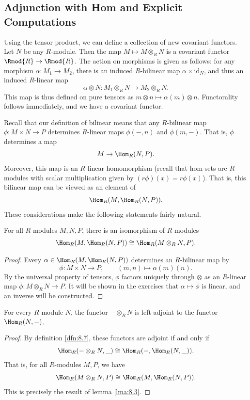 \subsection{Adjunction with Hom and Explicit Computations}
Using the tensor product, we can define a collection of new covariant functors. Let $N$ be any $R$-module. Then the map $M\mapsto M\otimes_R N$ is a covariant functor $\Rmod{R} \to \Rmod{R} $. The action on morphisms is given as follows: for any morphism $\alpha : M_1 \to M_2$, there is an induced $R$-bilinear map $\alpha \times \mathrm{id}_N$, and thus an induced $R$-linear map
\[
	\alpha \otimes N : M_1 \otimes_R N \to M_2 \otimes_R N
.\]
This map is thus defined on pure tensors as $m\otimes n\mapsto \alpha (m)\otimes n$. Functorality follows immediately, and we have a covariant functor.

Recall that our definition of bilinear means that any $R$-bilinear map $\phi : M\times N \to P$ determines $R$-linear maps $\phi (-,n)$ and $\phi (m,-)$. That is, $\phi $ determines a map
\[
	M\to \Hom_{R}(N, P) 
.\]
Moreover, this map is an $R$-linear homomorphism (recall that hom-sets are $R$-modules with scalar multiplication given by $(r\phi )(x)=r\phi (x)$). That is, this bilinear map can be viewed as an element of
\[\Hom_{R}(M, \Hom_{R}(N, P) ) .\]
These considerations make the following statements fairly natural.
\begin{lemma}\label{lma:8.3}
	For all $R$-modules $M,N,P$, there is an isomorphism of $R$-modules
	\[
		\Hom_{R}(M, \Hom_{R}(N, P) ) \cong \Hom_{R}(M\otimes_RN, P) 
	.\]
\end{lemma}
\begin{proof}
	Every $\alpha \in \Hom_{R}(M, \Hom_{R}(N, P) ) $ determines an $R$-bilinear map by
	\[
		\phi : M\times N \to P,\qquad (m,n)\mapsto \alpha (m)(n)
	.\]
	By the universal property of tensors, $\phi $ factors uniquely through $\otimes $ as an $R$-linear map $\overline{\phi } : M\otimes_R N \to P$. It will be shown in the exercises that $\alpha \mapsto \overline{\phi } $ is linear, and an inverse will be constructed.
\end{proof}
\begin{corollary}\label{cor:8.1}
	For every $R$-module $N$, the functor $-\otimes_R N$ is left-adjoint to the functor $\Hom_{R}(N, -) $.
\end{corollary}
\begin{proof}
	By definition \ref{dfn:8.7}, these functors are adjoint if and only if
	\[
		\Hom_{R}(-\otimes_R N, \_) \cong \Hom_{R}(-, \Hom_{R}(N, \_) ) 
	.\]
	That is, for all $R$-modules $M,P$, we have
	\[
		\Hom_{R}(M\otimes_R N, P) \cong \Hom_{R}(M, \Hom_{R}(N, P) ) 
	.\]
	This is precisely the result of lemma \ref{lma:8.3}.
\end{proof}
